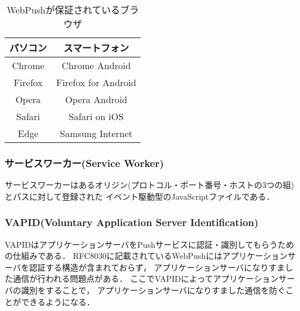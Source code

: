 \documentclass[12pt]{honka_v1}
\begin{document}
\begin{table}[htbp]
    \caption{WebPushが保証されているブラウザ\cite{bib:pushapi-web}}
    \label{tb:WebPush-browser}
    \centering
    \begin{tabular}{c|c}\hline
        パソコン & スマートフォン \\
        \hline
        Chrome & Chrome Android\\
        Firefox & Firefox for Android\\
        Opera & Opera Android \\
        Safari & Safari on iOS\\
        Edge & Samsung Internet\\
        \hline
    \end{tabular}
\end{table}

\subsubsection{サービスワーカー(Service Worker)}
サービスワーカーはあるオリジン(プロトコル・ポート番号・ホストの3つの組)とパスに対して登録された
イベント駆動型のJavaScriptファイルである\cite{bib:serviceworker-web}．

\subsubsection{VAPID(Voluntary Application Server Identification)}
VAPIDはアプリケーションサーバをPushサービスに認証・識別してもらうための仕組みである\cite{bib:vapid-rfc}．
RFC8030\cite{bib:webpush-rfc}に記載されているWebPushにはアプリケーションサーバを認証する構造が含まれておらず，
アプリケーションサーバになりすました通信が行われる問題点がある．
ここでVAPIDによってアプリケーションサーバの識別をすることで，
アプリケーションサーバになりすました通信を防ぐことができるようになる．
\end{document}
